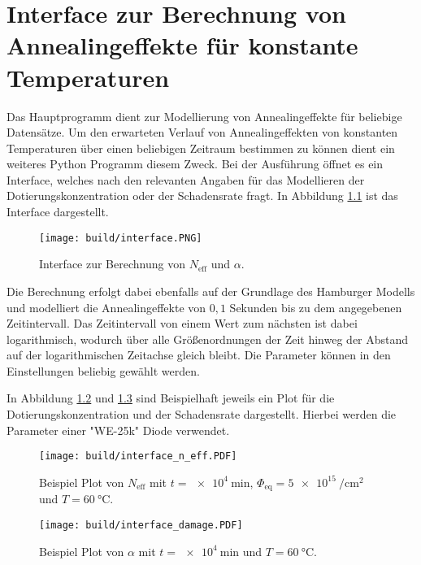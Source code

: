 \chapter{Interface zur Berechnung von Annealingeffekte für konstante Temperaturen}
Das Hauptprogramm dient zur Modellierung von Annealingeffekte für beliebige Datensätze.
Um den erwarteten Verlauf von Annealingeffekten von konstanten Temperaturen über einen
beliebigen Zeitraum bestimmen zu können dient ein weiteres Python Programm diesem Zweck.
Bei der Ausführung öffnet es ein Interface, welches nach den relevanten Angaben für
das Modellieren der Dotierungskonzentration oder der Schadensrate fragt. In Abbildung \ref{fig:interface}
ist das Interface dargestellt.

\begin{figure}
    \texttt{[image: build/interface.PNG]}
\caption{Interface zur Berechnung von $N_{\mathrm{eff}}$ und $\alpha$.}
\label{fig:interface}
\end{figure}

Die Berechnung erfolgt dabei ebenfalls auf der Grundlage des Hamburger Modells und modelliert die
Annealingeffekte von
$0,1$ Sekunden bis zu dem angegebenen Zeitintervall.
Das Zeitintervall von einem Wert zum nächsten ist dabei logarithmisch, wodurch über alle
Größenordnungen der Zeit hinweg der Abstand auf der logarithmischen Zeitachse gleich bleibt.
Die Parameter können in den Einstellungen beliebig gewählt werden.

In Abbildung \ref{fig:inter_n} und \ref{fig:inter_damage} sind Beispielhaft jeweils ein Plot für die Dotierungskonzentration und der
Schadensrate dargestellt. Hierbei werden die Parameter einer "WE-25k" Diode verwendet.


\begin{figure}
  \texttt{[image: build/interface\_n\_eff.PDF]}
  \caption{Beispiel Plot von $N_{\mathrm{eff}}$ mit $t = \SI{e4}{\minute}$, $\Phi_{\mathrm{eq}}= \SI{5e15}{\per\centi\meter\squared}$ und $T=\SI{60}{\celsius}$.}
  \label{fig:inter_n}
\end{figure}

\begin{figure}
  \texttt{[image: build/interface\_damage.PDF]}
  \caption{Beispiel Plot von $\alpha$ mit $t = \SI{e4}{\minute}$ und $T=\SI{60}{\celsius}$.}
  \label{fig:inter_damage}
\end{figure}
